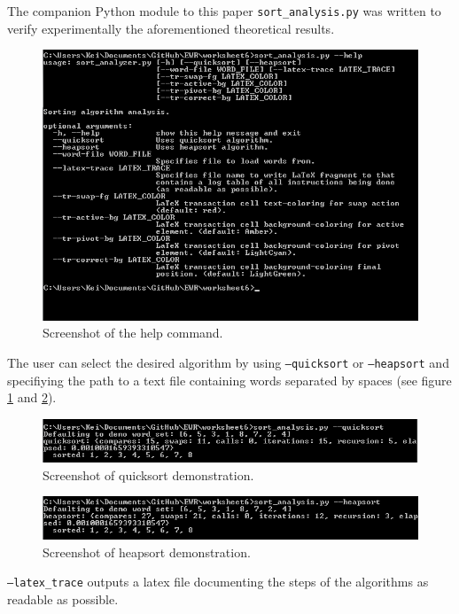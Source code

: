 The companion Python module to this paper \texttt{sort\_analysis.py} was written to verify experimentally the aforementioned theoretical results.

\begin{figure}
    \centering
    \includegraphics[width=0.95\linewidth]{images/help_command.png}
    \caption{Screenshot of the help command.}
\end{figure}

The user can select the desired algorithm by using \texttt{--quicksort} or \texttt{--heapsort} and specifiying the path to a text file containing words separated by spaces (see figure \ref{fig:quicksortdemo} and \ref{fig:heapsortdemo}).

\begin{figure}
    \centering
    \includegraphics[width=0.95\linewidth]{images/quicksort_demo.png}
    \caption{Screenshot of quicksort demonstration.}\label{fig:quicksortdemo}
\end{figure}
\begin{figure}
    \centering
    \includegraphics[width=0.95\linewidth]{images/heapsort_demo.png}
    \caption{Screenshot of heapsort demonstration.}\label{fig:heapsortdemo}
\end{figure}

\texttt{--latex\_trace} outputs a latex file documenting the steps of the algorithms as readable as possible.